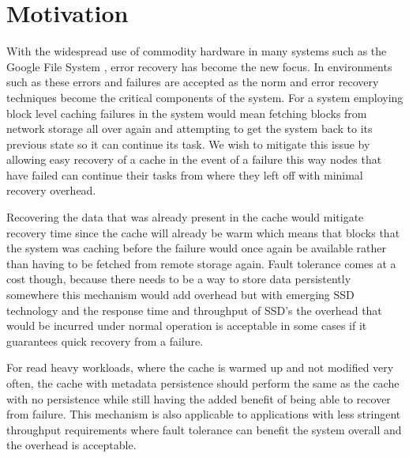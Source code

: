 \section{Motivation}
\label{sec:motivation}

With the widespread use of commodity hardware in many systems such as
the Google File System \cite{GFS}, error recovery has become the new
focus. In environments such as these errors and failures are accepted
as the norm and error recovery techniques become the critical
components of the system. For a system employing block level caching
failures in the system would mean fetching blocks from network storage
all over again and attempting to get the system back to its previous
state so it can continue its task. We wish to mitigate this issue by
allowing easy recovery of a cache in the event of a failure this way
nodes that have failed can continue their tasks from where they left
off with minimal recovery overhead.

Recovering the data that was already present in the cache would
mitigate recovery time since the cache will already be warm which
means that blocks that the system was caching before the failure would
once again be available rather than having to be fetched from remote
storage again. Fault tolerance comes at a cost though, because there
needs to be a way to store data persistently somewhere this mechanism
would add overhead but with emerging SSD technology and the response
time and throughput of SSD's the overhead that would be incurred under
normal operation is acceptable in some cases if it guarantees quick
recovery from a failure.

For read heavy workloads, where the cache is warmed up and not
modified very often, the cache with metadata persistence should
perform the same as the cache with no persistence while still having
the added benefit of being able to recover from failure. This
mechanism is also applicable to applications with less stringent
throughput requirements where fault tolerance can benefit the system
overall and the overhead is acceptable.
